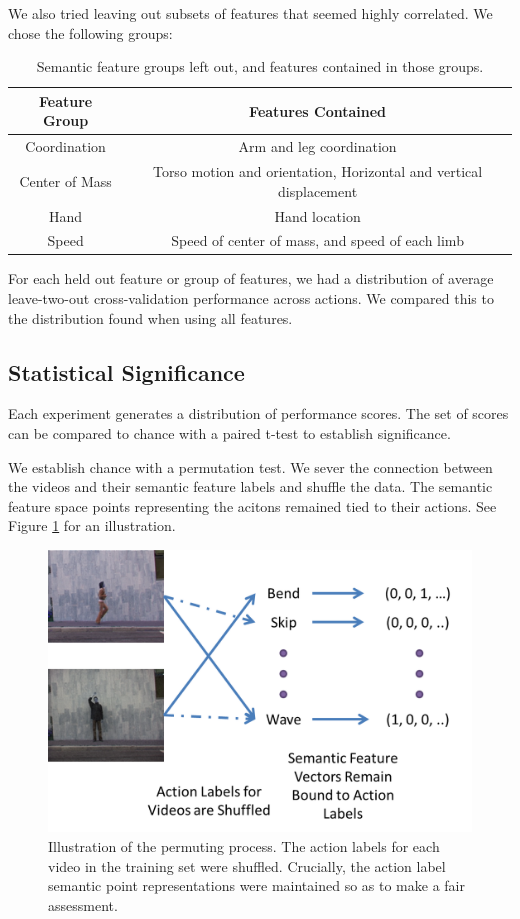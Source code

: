 \documentclass{article}
\begin{document}
We also tried leaving out subsets of features that seemed highly correlated. We chose the following groups:

\begin{table}[h]
\centering
\begin{tabular}{c|c}
Feature Group & Features Contained\\ \hline
Coordination & Arm and leg coordination \\ \hline
Center of Mass & Torso motion and orientation, Horizontal and vertical displacement\\ \hline
Hand & Hand location \\ \hline
Speed & Speed of center of mass, and speed of each limb \\
\end{tabular}
\label{featgrp}
\caption{Semantic feature groups left out, and features contained in those groups.}
\end{table}

For each held out feature or group of features, we had a distribution of average leave-two-out cross-validation performance across actions.  We compared this to the distribution found when using all features.

\label{fcomp}

\subsection{Statistical Significance}
Each experiment generates a distribution of performance scores. The set of scores can be compared to chance with a paired t-test to establish significance.

We establish chance with a permutation test. We sever the connection between the videos and their semantic feature labels and shuffle the data. The semantic feature space points representing the acitons remained tied to their actions. See Figure \ref{st} for an illustration.

\begin{figure}[h]
  \centering
  \includegraphics[width=.45\linewidth]{shuffle}
  \caption{Illustration of the permuting process. The action labels for each video in the training set were shuffled. Crucially, the action label semantic point representations were maintained so as to make a fair assessment.}
  \label{st}
\end{figure}
\end{document}
